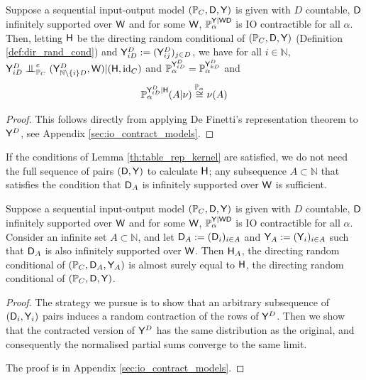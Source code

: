 \begin{lemma}\label{lem:ciid_yd}
Suppose a sequential input-output model $(\mathbb{P}_C,\mathsf{D},\mathsf{Y})$ is given with $D$ countable, $\mathsf{D}$ infinitely supported over $\mathsf{W}$ and for some $\mathsf{W}$, $\mathbb{P}_\alpha^{\mathsf{Y}|\mathsf{WD}}$ is IO contractible for all $\alpha$. Then, letting $\mathsf{H}$ be the directing random conditional of $(\mathbb{P}_C,\mathsf{D},\mathsf{Y})$ (Definition \ref{def:dir_rand_cond}) and $\mathsf{Y}^D_{iD}:=(\mathsf{Y}^D_{ij})_{j\in D}$, we have for all $i\in\mathbb{N}$, $\RV{Y}^D_{iD}\CI^e_{\prob{P}_C} (\RV{Y}^D_{\mathbb{N}\setminus\{i\}D},\RV{W}) | (\RV{H},\text{id}_C)$ and $\mathbb{P}_\alpha^{\mathsf{Y}^D_{iD}} = \mathbb{P}_\alpha^{\mathsf{Y}^D_{kD}}$ and
\begin{align}
    \mathbb{P}_\alpha^{\mathsf{Y}^D_{iD}|\mathsf{H}}(A|\nu) \overset{\mathbb{P}_\alpha}{\cong} \nu(A)
\end{align}
\end{lemma}

\begin{proof}
This follows directly from applying De Finetti's representation theorem to $\mathsf{Y}^D$, see Appendix \ref{sec:io_contract_models}.
\end{proof}

If the conditions of Lemma \ref{th:table_rep_kernel} are satisfied, we do not need the full sequence of pairs $(\mathsf{D},\mathsf{Y})$ to calculate $\mathsf{H}$; any subsequence $A\subset\mathbb{N}$ that satisfies the condition that $\mathsf{D}_A$ is infinitely supported over $\mathsf{W}$ is sufficient.

\begin{theorem}\label{th:any_infinite_sequence}
Suppose a sequential input-output model $(\mathbb{P}_C,\mathsf{D},\mathsf{Y})$ is given with $D$ countable,  $\mathsf{D}$ infinitely supported over $\mathsf{W}$ and for some $\mathsf{W}$, $\mathbb{P}_\alpha^{\mathsf{Y}|\mathsf{WD}}$ is IO contractible for all $\alpha$. Consider an infinite set $A\subset \mathbb{N}$, and let $\mathsf{D}_A:=(\mathsf{D}_i)_{i\in A}$ and $\mathsf{Y}_A:=(\mathsf{Y}_i)_{i\in A}$ such that $\mathsf{D}_A$ is also infinitely supported over $\mathsf{W}$. Then $\mathsf{H}_A$, the directing random conditional of $(\mathbb{P}_C,\mathsf{D}_A,\mathsf{Y}_A)$ is almost surely equal to $\mathsf{H}$, the directing random conditional of $(\mathbb{P}_C,\mathsf{D},\mathsf{Y})$.
\end{theorem}

\begin{proof}
The strategy we pursue is to show that an arbitrary subsequence of $(\mathsf{D}_i,\mathsf{Y}_i)$ pairs induces a random contraction of the rows of $\mathsf{Y}^D$. Then we show that the contracted version of $\mathsf{Y}^D$ has the same distribution as the original, and consequently the normalised partial sums converge to the same limit.

The proof is in Appendix \ref{sec:io_contract_models}.
\end{proof}

